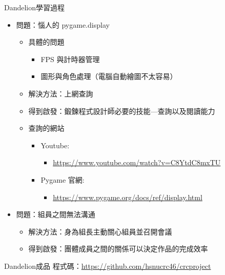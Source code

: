\documentclass{article}
\begin{document}
\begin{large}
\begin{boxpar}{Dandelion}{學習過程}
\begin{itemize}
\begin{itemize}
        \end{itemize}
        \item 問題：惱人的 pygame.display
        \begin{itemize}
            \item 具體的問題
                \begin{itemize}
                    \item FPS 與計時器管理
                    \item 圖形與角色處理（電腦自動繪圖不太容易）
                \end{itemize}
            \item 解決方法：上網查詢
            \item 得到啟發：鍛鍊程式設計師必要的技能—查詢以及閱讀能力
            \item 查詢的網站
                \begin{itemize}
                    \item Youtube:
                    \begin{itemize}
                        \item \url{https://www.youtube.com/watch?v=C8YtdC8mxTU}
                    \end{itemize}
                    \item Pygame 官網:
                        \begin{itemize}
                            \item \url{https://www.pygame.org/docs/ref/display.html}
                        \end{itemize}
                \end{itemize}
        \end{itemize}
    \item 問題：組員之間無法溝通
        \begin{itemize}
            \item 解決方法：身為組長主動關心組員並召開會議
            \item 得到啟發：團體成員之間的關係可以決定作品的完成效率
        \end{itemize}
\end{itemize}
    \end{boxpar}
\newpage
\begin{boxpar}{Dandelion}{成品}
    程式碼：\url{https://github.com/hsnucrc46/crcproject}\\

\end{boxpar}
\end{large}
\end{document}
